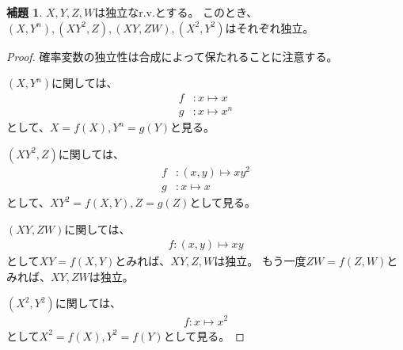 \documentclass[11pt, a4paper]{jsarticle}
\theoremstyle{definition}
\newtheorem*{lem*}{補題}
\begin{document}
      \begin{lem*}
        $X,Y,Z,W$は独立なr.v.とする。
        このとき、$(X,Y^n),(XY^2,Z),(XY,ZW),(X^2,Y^2)$はそれぞれ独立。
      \end{lem*}
      \begin{proof}
        確率変数の独立性は合成によって保たれることに注意する。

        $(X,Y^n)$に関しては、
        \begin{align*}
          f &\colon x \mapsto x \\
          g &\colon x \mapsto x^n
        \end{align*}
        として、$X = f(X), Y^n = g(Y)$と見る。

        $(XY^2,Z)$に関しては、
        \begin{align*}
          f &\colon (x, y) \mapsto xy^2 \\
          g &\colon x \mapsto x
        \end{align*}
        として、$XY^2 = f(X,Y), Z = g(Z)$として見る。

        $(XY,ZW)$に関しては、
        \begin{align*}
          f \colon (x, y) \mapsto xy
        \end{align*}
        として$XY = f(X,Y)$とみれば、$XY,Z,W$は独立。
        もう一度$ZW = f(Z,W)$とみれば、$XY,ZW$は独立。

        $(X^2,Y^2)$に関しては、
        \begin{align*}
          f \colon x \mapsto x^2
        \end{align*}
        として$X^2 = f(X), Y^2 = f(Y)$として見る。
      \end{proof}
\end{document}
